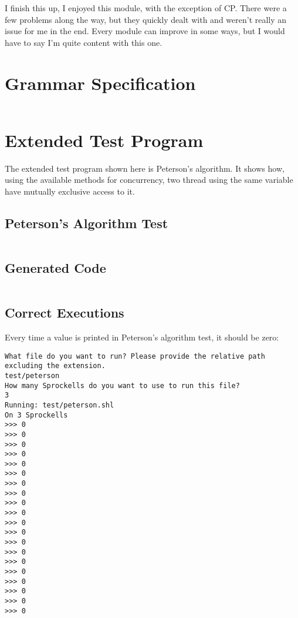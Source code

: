 \documentclass[twoside]{report}
\begin{document}
I finish this up, I enjoyed this module, with the exception of CP. There were a few problems along the way, but they quickly dealt with and weren't really an issue for me in the end. Every module can improve in some ways, but I would have to say I'm quite content with this one.


\begin{appendices}
\label{appendices}


\chapter{Grammar Specification}
\label{grammar_specification}
\begin{landscape}
\inputminted[firstline=66, lastline=138, tabsize=4]{haskell}{../Grammar.hs}
\end{landscape}


\chapter{Extended Test Program}
\label{extended_test_program}
The extended test program shown here is Peterson's algorithm. It shows how, using the available methods for concurrency, two thread using the same variable have mutually exclusive access to it.

\section{Peterson's Algorithm Test}
\inputminted[tabsize=4,linenos,firstnumber=1]{text}{../test/peterson.shl}

\section{Generated Code}
\inputminted[tabsize=4,linenos,firstnumber=0]{text}{../test/peterson_gen.txt}

\section{Correct Executions}
Every time a value is printed in Peterson's algorithm test, it should be zero:
\begin{verbatim}
What file do you want to run? Please provide the relative path excluding the extension.
test/peterson
How many Sprockells do you want to use to run this file?
3
Running: test/peterson.shl
On 3 Sprockells
>>> 0
>>> 0
>>> 0
>>> 0
>>> 0
>>> 0
>>> 0
>>> 0
>>> 0
>>> 0
>>> 0
>>> 0
>>> 0
>>> 0
>>> 0
>>> 0
>>> 0
>>> 0
>>> 0
>>> 0
\end{verbatim}


\end{appendices}
\end{document}
